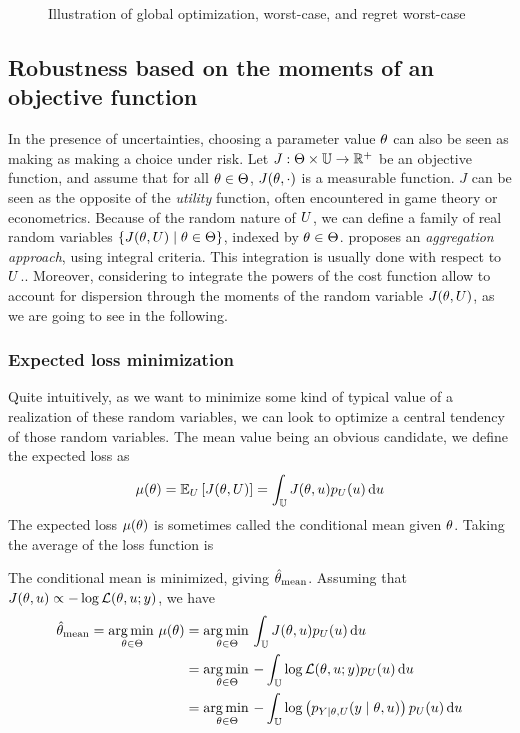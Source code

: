 \documentclass[../../Main_ManuscritThese.tex]{subfiles}
\newcommand\imgpath{/home/victor/acadwriting/Manuscrit/Text/Chapter3/img/}
\begin{document}
\begin{figure}[ht]
  \centering
  
  \caption{\label{fig:decision_under_uncertainty} Illustration of global optimization, worst-case, and regret worst-case}
\end{figure}


\subsection{Robustness based on the moments of an objective function}
In the presence of uncertainties, choosing a parameter value $\theta$ can also be seen as making as making a choice under risk. Let $J:\Theta \times \mathbb{U}\rightarrow \mathbb{R}^+$ be an objective function, and assume that for all $\theta \in \Theta$, $J(\theta, \cdot)$ is a measurable function.
$J$ can be seen as the opposite of the \emph{utility} function, often encountered in game theory or econometrics.
Because of the random nature of $U$, we can define a family of real random variables $\{J(\theta,U) \mid \theta \in \Theta\}$, indexed by $\theta \in \Theta$. \cite{beyer_robust_2007} proposes an \emph{aggregation approach}, using integral criteria. This integration is usually done with respect to $U$.. Moreover, considering to integrate the powers of the cost function allow to account for dispersion through the moments of the random variable $J(\theta, U)$, as we are going to see in the following.

\subsubsection{Expected loss minimization}
\label{sec:exp_loss_minimization}

Quite intuitively, as we want to minimize some kind of typical value of a realization of these random variables, we can look to optimize a central tendency of those random variables. The mean value being an obvious candidate, we define the expected loss as
\begin{equation}
  \mu(\theta) = \mathbb{E}_U\left[J(\theta,U)\right] =\int_{\mathbb{U}} J(\theta,u)p_U(u)\,\mathrm{d}u
\end{equation}
The expected loss $\mu(\theta)$ is sometimes called the conditional mean given $\theta$. Taking the average of the loss function is

The conditional mean is minimized,  giving $\hat{\theta}_{\mathrm{mean}}$. Assuming that $J(\theta, u) \propto - \log \mathcal{L}(\theta,u;y)$, we have
\begin{align}
  \hat{\theta}_{\mathrm{mean}} = \operatorname*{arg\,min \,}_{\theta\in\Theta} \mu(\theta)&= \operatorname*{arg\,min \,}_{\theta\in\Theta}\int_{\mathbb{U}} J(\theta,u) p_{U}(u)\,\mathrm{d}u \\
                                                            &= \operatorname*{arg\,min \,}_{\theta\in\Theta} - \int_{\mathbb{U}} \log \mathcal{L}(\theta,u;y) p_{U}(u)\,\mathrm{d}u \\
                                                            &= \operatorname*{arg\,min \,}_{\theta\in\Theta} - \int_{\mathbb{U}}\log\left(p_{Y \mid \theta,U}(y \mid \theta,u)\right)p_{U}(u)\,\mathrm{d}u 
\end{align}
\end{document}
